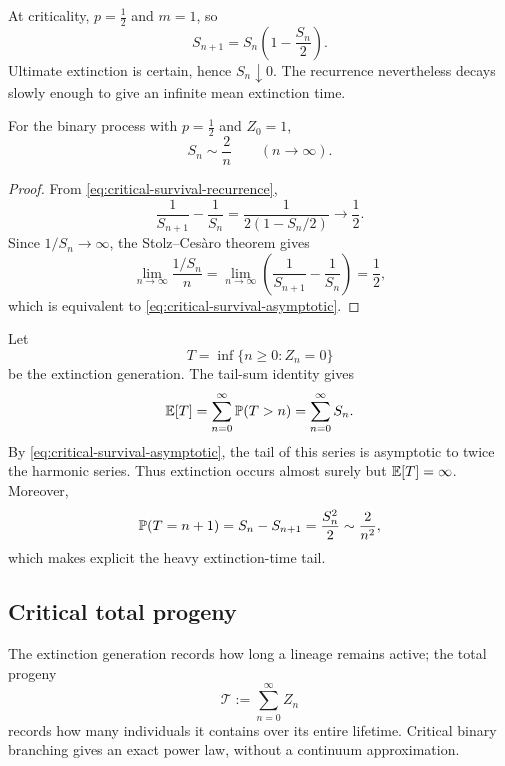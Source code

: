 At criticality, $p=\tfrac12$ and $m=1$, so
\begin{equation}
  S_{n+1}=S_n\left(1-\frac{S_n}{2}\right).
  \label{eq:critical-survival-recurrence}
\end{equation}
Ultimate extinction is certain, hence $S_n\downarrow0$.  The recurrence nevertheless decays slowly enough to give an infinite mean extinction time.

\begin{proposition}
For the binary process with $p=\tfrac12$ and $Z_0=1$,
\begin{equation}
  S_n\sim \frac{2}{n}
  \qquad (n\to\infty).
  \label{eq:critical-survival-asymptotic}
\end{equation}
\end{proposition}

\begin{proof}
From \cref{eq:critical-survival-recurrence},
\[
  \frac{1}{S_{n+1}}-\frac{1}{S_n}
  =\frac{1}{2(1-S_n/2)}
  \longrightarrow \frac12.
\]
Since $1/S_n\to\infty$, the Stolz--Ces\`aro theorem gives
\[
  \lim_{n\to\infty}\frac{1/S_n}{n}
  =\lim_{n\to\infty}
   \left(\frac{1}{S_{n+1}}-\frac{1}{S_n}\right)
  =\frac12,
\]
which is equivalent to \cref{eq:critical-survival-asymptotic}.
\end{proof}

Let
\[
  T=\inf\{n\ge0:Z_n=0\}
\]
be the extinction generation.  The tail-sum identity gives
\begin{equation}
  \mathbb{E}[T]=\sum_{n=0}^{\infty}\mathbb{P}(T>n)
       =\sum_{n=0}^{\infty}S_n.
  \label{eq:extinction-tail-sum}
\end{equation}
By \cref{eq:critical-survival-asymptotic}, the tail of this series is asymptotic to twice the harmonic series.  Thus extinction occurs almost surely but $\mathbb{E}[T]=\infty$.  Moreover,
\[
  \mathbb{P}(T=n+1)=S_n-S_{n+1}=\frac{S_n^2}{2}
  \sim \frac{2}{n^2},
\]
which makes explicit the heavy extinction-time tail.

\subsection{Critical total progeny}
\label{sec:critical-total-progeny}

The extinction generation records how long a lineage remains active; the total progeny
\[
  \mathcal{T}:=\sum_{n=0}^{\infty}Z_n
\]
records how many individuals it contains over its entire lifetime.  Critical binary branching gives an exact power law, without a continuum approximation.

